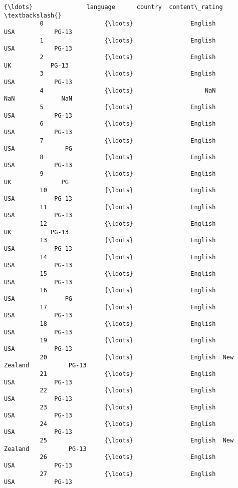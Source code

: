 \documentclass[11pt]{article}
\begin{document}
\begin{Verbatim}[commandchars=\\\{\}]
                            {\ldots}               language      country  content\_rating  \textbackslash{}
          0                 {\ldots}                English          USA           PG-13   
          1                 {\ldots}                English          USA           PG-13   
          2                 {\ldots}                English           UK           PG-13   
          3                 {\ldots}                English          USA           PG-13   
          4                 {\ldots}                    NaN          NaN             NaN   
          5                 {\ldots}                English          USA           PG-13   
          6                 {\ldots}                English          USA           PG-13   
          7                 {\ldots}                English          USA              PG   
          8                 {\ldots}                English          USA           PG-13   
          9                 {\ldots}                English           UK              PG   
          10                {\ldots}                English          USA           PG-13   
          11                {\ldots}                English          USA           PG-13   
          12                {\ldots}                English           UK           PG-13   
          13                {\ldots}                English          USA           PG-13   
          14                {\ldots}                English          USA           PG-13   
          15                {\ldots}                English          USA           PG-13   
          16                {\ldots}                English          USA              PG   
          17                {\ldots}                English          USA           PG-13   
          18                {\ldots}                English          USA           PG-13   
          19                {\ldots}                English          USA           PG-13   
          20                {\ldots}                English  New Zealand           PG-13   
          21                {\ldots}                English          USA           PG-13   
          22                {\ldots}                English          USA           PG-13   
          23                {\ldots}                English          USA           PG-13   
          24                {\ldots}                English          USA           PG-13   
          25                {\ldots}                English  New Zealand           PG-13   
          26                {\ldots}                English          USA           PG-13   
          27                {\ldots}                English          USA           PG-13   

\end{Verbatim}
\end{document}

